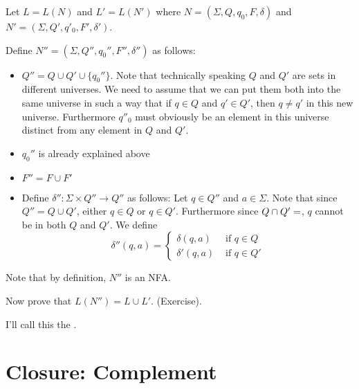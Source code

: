Let $L = L(N)$ and $L' = L(N')$ where $N = (\Sigma, Q, q_0, F,
\delta)$ and $N' = (\Sigma, Q', q'_0, F', \delta')$.

Define $N'' = (\Sigma, Q'', q_0'', F'', \delta'')$ as follows:
\begin{itemize}
\item $Q'' = Q \cup Q' \cup\{q_0''\}$. Note that technically
  speaking $Q$ and $Q'$ are sets in different universes. We need to
  assume that we can put them both into the same universe in such a
  way that if $q \in Q$ and $q' \in Q'$, then $q \neq q'$ in this new
  universe. Furthermore $q''_0$ must obviously be an element in this
  universe distinct from any element in $Q$ and $Q'$.
\item $q_0''$ is already explained above
\item $F'' = F \cup F'$
\item Define $\delta'' : \Sigma \times Q'' \rightarrow Q''$ as
  follows: Let $q \in Q''$ and $a \in \Sigma$. Note that since $Q'' = Q \cup Q'$, either
  $q \in Q$ or $q \in Q'$. Furthermore since $Q \cap Q' = \empty$, $q$
  cannot be in both $Q$ and $Q'$. We define
  \[
  \delta''(q,a) =
  \begin{cases}
    \delta(q,a) & \text{ if } q \in Q \\
    \delta'(q,a) & \text{ if } q \in Q'
  \end{cases}
  \]
\end{itemize}
Note that by definition, $N''$ is an NFA.

Now prove that $L(N'') = L \cup L'$. (Exercise).

I'll call this the .



\newpage
\section{Closure: Complement}

